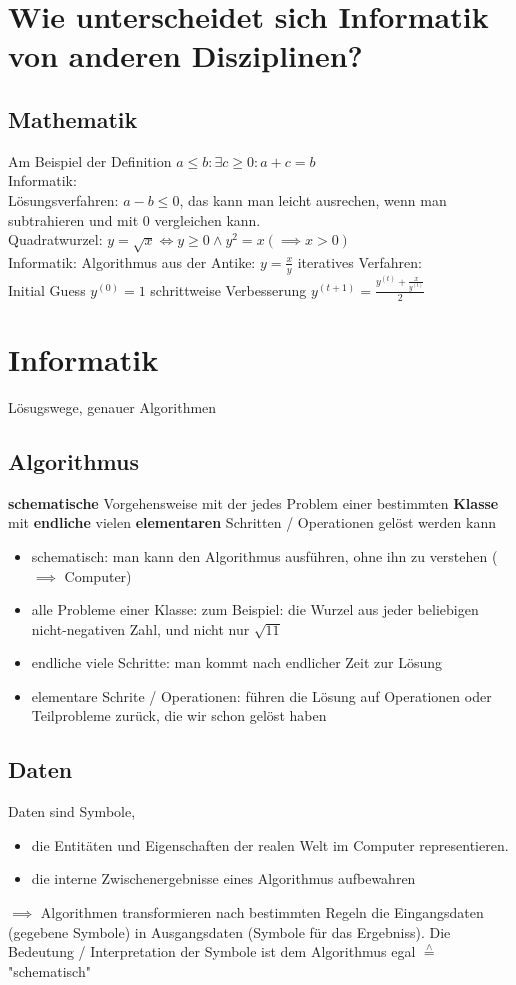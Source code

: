 \documentclass[a4paper]{scrartcl}
\newcommand{\estimates}{\overset{\scriptscriptstyle\wedge}{=}}%
\begin{document}
\section{Wie unterscheidet sich Informatik von anderen Disziplinen?}
\label{sec-2}
\subsection{Mathematik}
\label{sec-2-1}
Am Beispiel der Definition $a \leq b: \exists c \geq 0: a + c = b$ \\
   Informatik: \\
   Lösungsverfahren: $a - b \leq 0$, das kann man leicht ausrechen, wenn man subtrahieren und mit $0$ vergleichen kann. \\
   Quadratwurzel: $y = \sqrt{x} \iff y \geq 0 \wedge y^2 = x (\implies x > 0)$ \\
   Informatik: Algorithmus aus der Antike: $y = \frac{x}{y}$
iteratives Verfahren: \\
   Initial Guess $y^{(0)} = 1$
schrittweise Verbesserung $y^{(t+1)} = \frac{y^{(t)} + \frac{x}{y^{(t)}}}{2}$
\section{Informatik}
\label{sec-3}
Lösugswege, genauer Algorithmen
\subsection{Algorithmus}
\label{sec-3-1}
\textbf{schematische} Vorgehensweise mit der jedes Problem einer bestimmten \textbf{Klasse} mit \textbf{endliche} vielen \textbf{elementaren} Schritten / Operationen gelöst werden kann
\begin{itemize}
\item schematisch: man kann den Algorithmus ausführen, ohne ihn zu verstehen ($\implies$ Computer)
\item alle Probleme einer Klasse: zum Beispiel: die Wurzel aus jeder beliebigen nicht-negativen Zahl, und nicht nur $\sqrt{11}$
\item endliche viele Schritte: man kommt nach endlicher Zeit zur Lösung
\item elementare Schrite / Operationen: führen die Lösung auf Operationen oder Teilprobleme zurück, die wir schon gelöst haben
\end{itemize}
\subsection{Daten}
\label{sec-3-2}
Daten sind Symbole,
\begin{itemize}
\item die Entitäten und Eigenschaften der realen Welt im Computer representieren.
\item die interne Zwischenergebnisse eines Algorithmus aufbewahren
\end{itemize}
$\implies$ Algorithmen transformieren nach bestimmten Regeln die Eingangsdaten (gegebene Symbole) in Ausgangsdaten (Symbole für das Ergebniss).
Die Bedeutung / Interpretation der Symbole ist dem Algorithmus egal $\estimates$ "schematisch"
\end{document}

